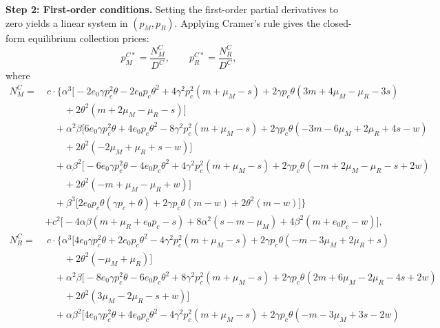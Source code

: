 \documentclass[authoryear,preprint,review,times,10pt]{elsarticle}
\begin{document}
\textbf{Step 2: First-order conditions.} Setting the first-order partial derivatives to zero yields a linear system in $(p_M, p_R)$. Applying Cramer's rule gives the closed-form equilibrium collection prices:
\begin{equation}
p_M^{C*} = \frac{N_M^{C}}{D^{C}}, \qquad p_R^{C*} = \frac{N_R^{C}}{D^{C}},
\tag{D1}
\end{equation}
where
\begin{equation}
\begin{aligned}
N_M^{C} =&\ c \cdot \big\{ \alpha^{3}\big[-2 e_{0}\gamma p_{c}^{2}\theta - 2 e_{0} p_{c}\theta^{2} + 4\gamma^{2} p_{c}^{2}(m + \mu_{M} - s) + 2\gamma p_{c}\theta(3m + 4\mu_{M} - \mu_{R} - 3s) \\
&\qquad + 2\theta^{2}(m + 2\mu_{M} - \mu_{R} - s)\big] \\
&\quad + \alpha^{2}\beta\big[6 e_{0}\gamma p_{c}^{2}\theta + 4 e_{0} p_{c}\theta^{2} - 8\gamma^{2} p_{c}^{2}(m + \mu_{M} - s) + 2\gamma p_{c}\theta(-3m - 6\mu_{M} + 2\mu_{R} + 4s - w) \\
&\qquad + 2\theta^{2}(-2\mu_{M} + \mu_{R} + s - w)\big] \\
&\quad + \alpha\beta^{2}\big[-6 e_{0}\gamma p_{c}^{2}\theta - 4 e_{0} p_{c}\theta^{2} + 4\gamma^{2} p_{c}^{2}(m + \mu_{M} - s) + 2\gamma p_{c}\theta(-m + 2\mu_{M} - \mu_{R} - s + 2w) \\
&\qquad + 2\theta^{2}(-m + \mu_{M} - \mu_{R} + w)\big] \\
&\quad + \beta^{3}\big[2 e_{0} p_{c}\theta(\gamma p_{c} + \theta) + 2\gamma p_{c}\theta(m - w) + 2\theta^{2}(m - w)\big] \big\} \\
&+ c^{2}\big[-4\alpha\beta(m + \mu_{R} + e_{0} p_{c} - s) + 8\alpha^{2}(s - m - \mu_{M}) + 4\beta^{2}(m + e_{0} p_{c} - w)\big], \\[3pt]
N_R^{C} =&\ c \cdot \big\{ \alpha^{3}\big[4 e_{0}\gamma p_{c}^{2}\theta + 2 e_{0} p_{c}\theta^{2} - 4\gamma^{2} p_{c}^{2}(m + \mu_{M} - s) + 2\gamma p_{c}\theta(-m - 3\mu_{M} + 2\mu_{R} + s) \\
&\qquad + 2\theta^{2}(-\mu_{M} + \mu_{R})\big] \\
&\quad + \alpha^{2}\beta\big[-8 e_{0}\gamma p_{c}^{2}\theta - 6 e_{0} p_{c}\theta^{2} + 8\gamma^{2} p_{c}^{2}(m + \mu_{M} - s) + 2\gamma p_{c}\theta(2m + 6\mu_{M} - 2\mu_{R} - 4s + 2w) \\
&\qquad + 2\theta^{2}(3\mu_{M} - 2\mu_{R} - s + w)\big] \\
&\quad + \alpha\beta^{2}\big[4 e_{0}\gamma p_{c}^{2}\theta + 4 e_{0} p_{c}\theta^{2} - 4\gamma^{2} p_{c}^{2}(m + \mu_{M} - s) + 2\gamma p_{c}\theta(-m - 3\mu_{M} + 3s - 2w) \\

\end{aligned}
\end{equation}
\end{document}
